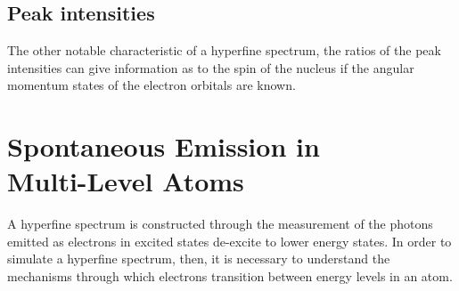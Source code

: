 \documentclass[12pt,a4paper,margin=1in]{report}
\begin{document}
\subsection{Peak intensities} 
The other notable characteristic of a hyperfine spectrum, the ratios of the peak intensities can give information as to the spin of the nucleus if the angular momentum states of the electron orbitals are known. 

\section{Spontaneous Emission in \\ Multi-Level Atoms}
\label{ALI}
A hyperfine spectrum is constructed through the measurement of the photons emitted as electrons in excited states de-excite to lower energy states. In order to simulate a hyperfine spectrum, then, it is necessary to understand the mechanisms through which electrons transition between energy levels in an atom.
\end{document}
